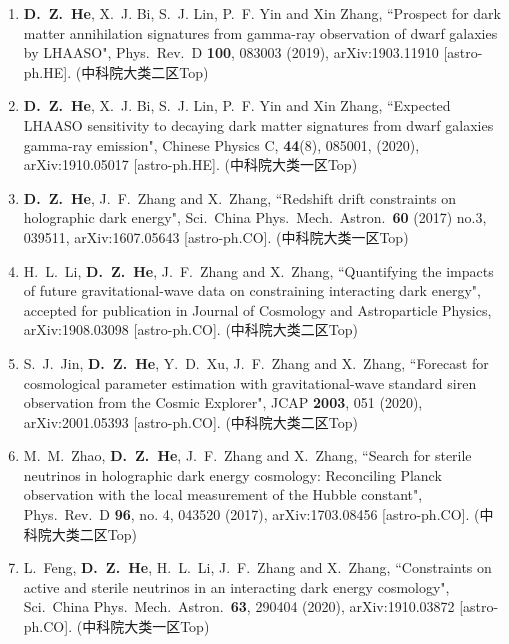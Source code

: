   \begin{enumerate}[leftmargin=*]    
    \item \textbf{D.~Z.~He}, X.~J. Bi, S.~J. Lin, P.~F. Yin and Xin Zhang, ``Prospect for dark matter annihilation signatures from gamma-ray observation of dwarf galaxies by LHAASO", Phys.\ Rev.\ D {\bf 100}, 083003 (2019), arXiv:1903.11910 [astro-ph.HE]. (中科院大类二区Top)
    
    \item \textbf{D.~Z.~He}, X.~J. Bi, S.~J. Lin, P.~F. Yin and Xin Zhang, ``Expected LHAASO sensitivity to decaying dark matter signatures from dwarf galaxies gamma-ray emission", Chinese Physics C, {\bf 44}(8), 085001, (2020), arXiv:1910.05017 [astro-ph.HE]. (中科院大类一区Top)
          
    \item \textbf{D.~Z.~He}, J.~F.~Zhang and X.~Zhang, ``Redshift drift constraints on holographic dark energy", Sci.\ China Phys.\ Mech.\ Astron.\  {\bf 60} (2017) no.3, 039511, arXiv:1607.05643 [astro-ph.CO]. (中科院大类一区Top)

    \item H.~L.~Li, \textbf{D.~Z.~He}, J.~F.~Zhang and X.~Zhang, ``Quantifying the impacts of future gravitational-wave data on constraining interacting dark energy", accepted for publication in Journal of Cosmology and Astroparticle Physics, arXiv:1908.03098 [astro-ph.CO]. (中科院大类二区Top)

   \item S.~J.~Jin, \textbf{D.~Z.~He}, Y.~D.~Xu, J.~F.~Zhang and X.~Zhang, ``Forecast for cosmological parameter estimation with gravitational-wave standard siren observation from the Cosmic Explorer", JCAP {\bf 2003}, 051 (2020), arXiv:2001.05393 [astro-ph.CO]. (中科院大类二区Top)
   
    \item  M.~M.~Zhao, \textbf{D.~Z.~He}, J.~F.~Zhang and X.~Zhang, ``Search for sterile neutrinos in holographic dark energy cosmology: Reconciling Planck observation with the local measurement of the Hubble constant", Phys.\ Rev.\ D {\bf 96}, no. 4, 043520 (2017), arXiv:1703.08456 [astro-ph.CO]. (中科院大类二区Top)         

    \item L.~Feng, {\bf D.~Z.~He}, H.~L.~Li, J.~F.~Zhang and X.~Zhang, ``Constraints on active and sterile neutrinos in an interacting dark energy cosmology", Sci.\ China Phys.\ Mech.\ Astron.\  {\bf 63}, 290404 (2020), arXiv:1910.03872 [astro-ph.CO]. (中科院大类一区Top)


\end{enumerate}
